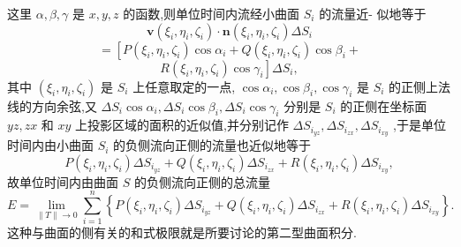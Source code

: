 这里 \(\alpha ,\beta ,\gamma\) 是 \(x,y,z\) 的函数,则单位时间内流经小曲面 \({S}_{i}\) 的流量近- 似地等于
\[
\mathbf{v}\left( {{\xi }_{i},{\eta }_{i},{\zeta }_{i}}\right)  \cdot  \mathbf{n}\left( {{\xi }_{i},{\eta }_{i},{\zeta }_{i}}\right) \Delta {S}_{i}
\]
\[
= \left\lbrack  {P\left( {{\xi }_{i},{\eta }_{i},{\zeta }_{i}}\right) \cos {\alpha }_{i} + Q\left( {{\xi }_{i},{\eta }_{i},{\zeta }_{i}}\right) \cos {\beta }_{i} + }\right.
\]
\[
\left. {R\left( {{\xi }_{i},{\eta }_{i},{\zeta }_{i}}\right) \cos {\gamma }_{i}}\right\rbrack  \Delta {S}_{i},
\]
其中 \(\left( {{\xi }_{i},{\eta }_{i},{\zeta }_{i}}\right)\) 是 \({S}_{i}\) 上任意取定的一点, \(\cos {\alpha }_{i},\cos {\beta }_{i},\cos {\gamma }_{i}\) 是 \({S}_{i}\) 的正侧上法线的方向余弦,又 \(\Delta {S}_{i}\cos {\alpha }_{i},\Delta {S}_{i}\cos {\beta }_{i},\Delta {S}_{i}\cos {\gamma }_{i}\) 分别是 \({S}_{i}\) 的正侧在坐标面 \({yz},{zx}\) 和 \({xy}\) 上投影区域的面积的近似值,并分别记作 \(\Delta {S}_{{i}_{yz}},\Delta {S}_{{i}_{zx}},\Delta {S}_{{i}_{xy}}\) ,于是单位时间内由小曲面 \({S}_{i}\) 的负侧流向正侧的流量也近似地等于
\[
P\left( {{\xi }_{i},{\eta }_{i},{\zeta }_{i}}\right) \Delta {S}_{{i}_{yz}} + Q\left( {{\xi }_{i},{\eta }_{i},{\zeta }_{i}}\right) \Delta {S}_{{i}_{zx}} + R\left( {{\xi }_{i},{\eta }_{i},{\zeta }_{i}}\right) \Delta {S}_{{i}_{xy}},
\]
故单位时间内由曲面 \(S\) 的负侧流向正侧的总流量
\[
E = \mathop{\lim }\limits_{{\parallel T\parallel  \rightarrow  0}}\mathop{\sum }\limits_{{i = 1}}^{n}\left\{  {P\left( {{\xi }_{i},{\eta }_{i},{\zeta }_{i}}\right) \Delta {S}_{{i}_{yz}} + Q\left( {{\xi }_{i},{\eta }_{i},{\zeta }_{i}}\right) \Delta {S}_{{i}_{zx}} + R\left( {{\xi }_{i},{\eta }_{i},{\zeta }_{i}}\right) \Delta {S}_{{i}_{xy}}}\right\}  .
\]
这种与曲面的侧有关的和式极限就是所要讨论的第二型曲面积分.

